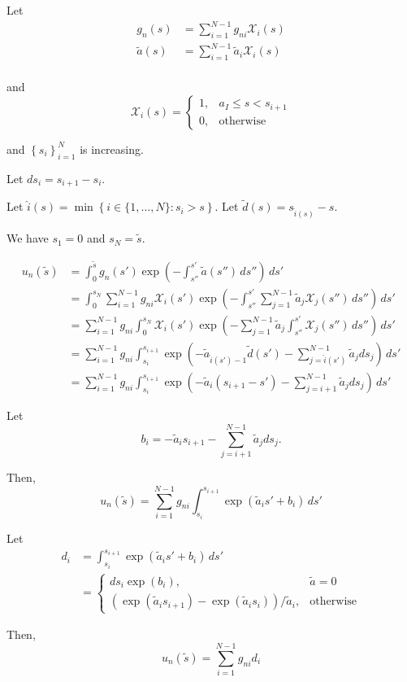 \documentclass[10pt]{article}
\begin{document}
Let
\begin{align}
  g_n(s) &= \sum_{i=1}^{N-1}g_{ni}\mathcal{X}_i(s) \\
  \tilde{a}(s) &= \sum_{i=1}^{N-1}\tilde{a}_{i}\mathcal{X}_i(s) \\
\end{align}

and
\begin{equation}
  \mathcal{X}_i(s) = \begin{cases}
    1, & a_I \leq s < s_{i+1} \\
    0, & \mbox{otherwise}
    \end{cases}
\end{equation}

and $\left\{s_i\right\}_{i=1}^N$ is increasing.

Let $ds_i = s_{i+1} - s_i$.

Let $\hat{i}(s) = \min\left\{ i \in \{1,\ldots,N\} : s_i>s \right\}$.
Let $\tilde{d}(s) = s_{\hat{i}(s)}-s$.

We have $s_1 = 0$ and $s_N = \tilde{s}$.


\begin{align}
  u_n(\tilde{s}) &= \int_0^{\tilde{s}}g_n(s')\exp\left( -\int_{s''}^{s'}\tilde{a}(s'')\,ds'' \right)\, ds' \\
  &= \int_0^{s_N} \sum_{i=1}^{N-1}g_{ni}\mathcal{X}_i(s') \exp\left( -\int_{s''}^{s'}\sum_{j=1}^{N-1}\tilde{a}_{j}\mathcal{X}_j(s'')\,ds'' \right)\, ds' \\
  &= \sum_{i=1}^{N-1}g_{ni}\int_0^{s_N} \mathcal{X}_i(s') \exp\left( -\sum_{j=1}^{N-1}\tilde{a}_{j}\int_{s''}^{s'}\mathcal{X}_j(s'')\,ds'' \right)\, ds' \\
  &= \sum_{i=1}^{N-1}g_{ni}\int_{s_i}^{s_{i+1}}  \exp\left(-\tilde{a}_{\hat{i}(s')-1}\tilde{d}(s') -\sum_{j=\hat{i}(s')}^{N-1}\tilde{a}_{j}ds_j\right)\, ds' \\
  &= \sum_{i=1}^{N-1}g_{ni}\int_{s_i}^{s_{i+1}}  \exp\left(-\tilde{a}_{i}(s_{i+1}-s') -\sum_{j=i+1}^{N-1}\tilde{a}_{j}ds_j\right)\, ds'
\end{align}

Let
\begin{equation}
  b_i = -\tilde{a}_{i}s_{i+1} - \sum_{j=i+1}^{N-1}\tilde{a}_{j}ds_j.
\end{equation}

Then,
\begin{equation}
  u_n(\tilde{s}) = \sum_{i=1}^{N-1}g_{ni}\int_{s_i}^{s_{i+1}}  \exp\left(\tilde{a}_{i}s' +b_i\right)\, ds'
\end{equation}

Let
\begin{align}
  d_i &= \int_{s_i}^{s_{i+1}}  \exp\left(\tilde{a}_{i}s' +b_i\right)\, ds' \\
    &= \begin{cases}
    ds_i \exp(b_i), & \tilde{a} = 0 \\
      \left( \exp(\tilde{a}_i s_{i+1}) - \exp(\tilde{a}_i s_i) \right)/\tilde{a}_i, & \mbox{otherwise}
    \end{cases}
\end{align}

Then,
\begin{equation}
  u_n(\tilde{s}) = \sum_{i=1}^{N-1} g_{ni}d_i
\end{equation}
\end{document}
